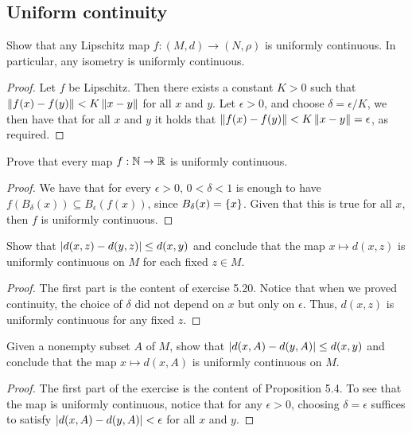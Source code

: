 \subsection{Uniform continuity}


\begin{exercise}{44}
Show that any Lipschitz map $f:(M,d)\to (N,\rho)$ is uniformly continuous. 
In particular, any isometry is uniformly continuous.
\end{exercise}
\begin{proof}
Let $f$ be Lipschitz.
Then there exists a constant $K>0$ such that $\left\lVert f(x)-f(y)\right\rVert < K\left\lVert x-y\right\rVert$ for all $x$ and $y$.
Let $\epsilon >0$, and choose $\delta = \epsilon/K$, we then have that for all $x$ and $y$ it holds that $\left\lVert f(x)-f(y)\right\rVert<K\left\lVert x-y\right\rVert=\epsilon$, as required.
\end{proof} 

\begin{exercise}{45}
Prove that every map $f:\mathbb{N}\to\mathbb{R}$ is uniformly continuous.
\end{exercise}
\begin{proof}
We have that for every $\epsilon>0$, $0<\delta<1$ is enough to have $f(B_\delta(x))\subseteq B_\epsilon(f(x))$, since $B_\delta(x)=\{x\}$.
Given that this is true for all $x$, then $f$ is uniformly continuous.
\end{proof} 

\begin{exercise}{46}
Show that $\left\lvert d(x,z)-d(y,z)\right\rvert \leq d(x,y)$ and conclude that the map $x\mapsto d(x,z)$ is uniformly continuous on $M$ for each fixed $z\in M$.
\end{exercise}
\begin{proof}
The first part is the content of exercise 5.20.
Notice that when we proved continuity, the choice of $\delta$ did not depend on $x$ but only on $\epsilon$.
Thus, $d(x,z)$ is uniformly continuous for any fixed $z$.
\end{proof} 

\begin{exercise}{47}
Given a nonempty subset $A$ of $M$, show that $\left\lvert d(x,A) - d(y,A)\right\rvert \leq d(x,y)$ and conclude that the map $x \mapsto d(x,A)$ is uniformly continuous on $M$.
\end{exercise}
\begin{proof}
The first part of the exercise is the content of Proposition 5.4.
To see that the map is uniformly continuous, notice that for any $\epsilon>0$, choosing $\delta=\epsilon$ suffices to satisfy $\left\lvert d(x,A) - d(y,A)\right\rvert< \epsilon$ for all $x$ and $y$.
\end{proof} 

